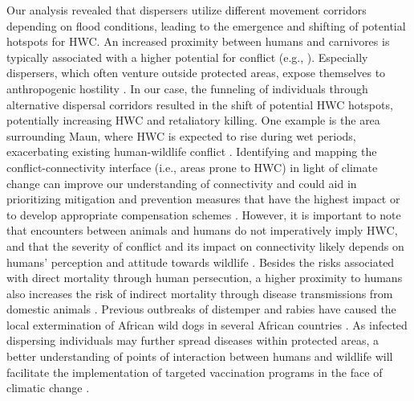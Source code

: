 \documentclass[../FinalThesis.tex]{subfiles}
\begin{document}

Our analysis revealed that dispersers utilize different movement corridors
depending on flood conditions, leading to the emergence and shifting of
potential hotspots for HWC. An increased proximity between humans and carnivores
is typically associated with a higher potential for conflict (e.g.,
\citealp{Michalski.2006, Chapman.2016}). Especially dispersers, which often
venture outside protected areas, expose themselves to anthropogenic hostility
\citep{Elliot.2014, Cozzi.2020, Vasudev.2023}. In our case, the funneling of
individuals through alternative dispersal corridors resulted in the shift of
potential HWC hotspots, potentially increasing HWC and retaliatory killing. One
example is the area surrounding Maun, where HWC is expected to rise during wet
periods, exacerbating existing human-wildlife conflict \citep{Gusset.2009,
McNutt.2017, Cozzi.2020}. Identifying and mapping the conflict-connectivity
interface (i.e., areas prone to HWC) in light of climate change can improve our
understanding of connectivity \citep{Vasudev.2023} and could aid in prioritizing
mitigation and prevention measures that have the highest impact
\citep{Treves.2011, Buchholtz.2020} or to develop appropriate compensation
schemes \citep{McNutt.2017}. However, it is important to note that encounters
between animals and humans do not imperatively imply HWC, and that the severity
of conflict and its impact on connectivity likely depends on humans' perception
and attitude towards wildlife \citep{Ghoddousi.2021}. Besides the risks
associated with direct mortality through human persecution, a higher proximity
to humans also increases the risk of indirect mortality through disease
transmissions from domestic animals \citep{Cleaveland.2000, VanDeBildt.2002}.
Previous outbreaks of distemper and rabies have caused the local extermination
of African wild dogs in several African countries \citep{Woodroffe.2004}. As
infected dispersing individuals may further spread diseases within protected
areas, a better understanding of points of interaction between humans and
wildlife will facilitate the implementation of targeted vaccination programs in
the face of climatic change \citep{Vial.2006}.

\end{document}
